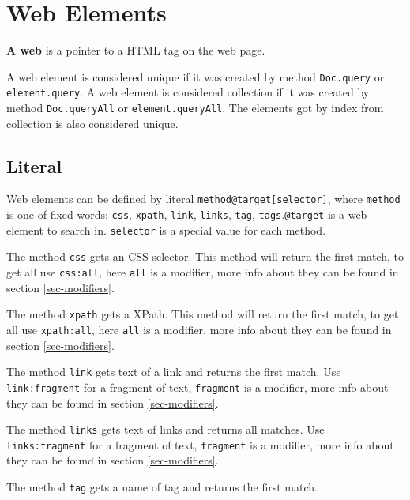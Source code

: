 \section{Web Elements}
\label{webelments}

{\bf A web \element} is a pointer to a HTML tag on the web page.

A web element is considered unique if it was created by method \texttt{Doc.query} or \texttt{element.query}. A web element is considered collection if it was created by method \texttt{Doc.queryAll} or \texttt{element.queryAll}. The elements got by index from collection is also considered unique.

\subsection{Literal}

Web elements can be defined by literal \texttt{method@target[selector]}, where \texttt{method} is one of fixed words: \texttt{css}, \texttt{xpath}, \texttt{link}, \texttt{links}, \texttt{tag}, \texttt{tags}.\texttt{@target} is a web element to search in. \texttt{selector} is a special value for each method. 

The method \texttt{css} gets an CSS selector. This method will return the first match, to get all use \texttt{css:all}, here \texttt{all} is a modifier, more info about they can be found in section \ref{sec-modifiers}.

The method \texttt{xpath} gets a XPath. This method will return the first match, to get all use \texttt{xpath:all}, here \texttt{all} is a modifier, more info about they can be found in section \ref{sec-modifiers}.

The method \texttt{link} gets text of a link and returns the first match. Use \texttt{link:fragment} for a fragment of text, \texttt{fragment} is a modifier, more info about they can be found in section \ref{sec-modifiers}.

The method \texttt{links} gets text of links and returns all matches. Use \texttt{links:fragment} for a fragment of text, \texttt{fragment} is a modifier, more info about they can be found in section \ref{sec-modifiers}.

The method \texttt{tag} gets a name of tag and returns the first match. 

